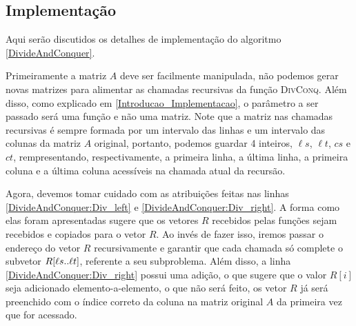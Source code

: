\subsection{Implementação} \label{DivisaoEConquista_Implementacao}
Aqui serão discutidos os detalhes de implementação do algoritmo \ref{DivideAndConquer}.  

Primeiramente a matriz $A$ deve ser facilmente manipulada, não podemos gerar novas matrizes para alimentar as chamadas recursivas da função \hbox{\textsc{DivConq}}. Além disso, como explicado em \ref{Introducao_Implementacao}, o parâmetro a ser passado será uma função e não uma matriz. Note que a matriz nas chamadas recursivas é sempre formada por um intervalo das linhas e um intervalo das colunas da matriz $A$ original, portanto, podemos guardar 4 inteiros, $\ell s$, $\ell t$, $cs$ e $ct$, rempresentando, respectivamente, a primeira linha, a última linha, a primeira coluna e a última coluna acessíveis na chamada atual da recursão.  

Agora, devemos tomar cuidado com as atribuições feitas nas linhas \ref{DivideAndConquer:Div_left} e \ref{DivideAndConquer:Div_right}. A forma como elas foram apresentadas sugere que os vetores $R$ recebidos pelas funções sejam recebidos e copiados para o vetor $R$. Ao invés de fazer isso, iremos passar o endereço do vetor $R$ recursivamente e garantir que cada chamada só complete o subvetor $R[\ell s .. \ell t]$, referente a seu subproblema. Além disso, a linha \ref{DivideAndConquer:Div_right} possui uma adição, o que sugere que o valor $R[i]$ seja adicionado elemento-a-elemento, o que não será feito, os vetor $R$ já será preenchido com o índice correto da coluna na matriz original $A$ da primeira vez que for acessado.


